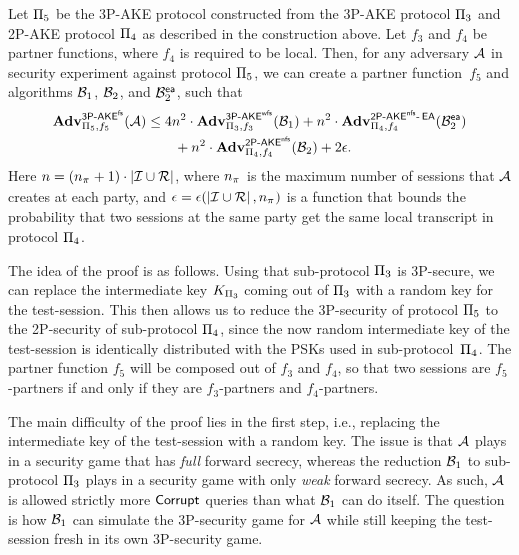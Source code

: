 \begin{theorem}\label{thm:protocol_5:3P-AKE}
Let $\protocol_5$ be the 3P-AKE protocol constructed from the 3P-AKE protocol $\protocol_3$ and 2P-AKE protocol $\protocol_4$ as described in the construction above.
Let $f_3$ and $f_4$ be partner functions,
where $f_4$ is required to be local.
Then,
for any adversary $\A$ in security experiment \akefstext against protocol $\protocol_5$,
we can create a partner function~$f_5$ and algorithms $\A[B]_1$, $\A[B]_2$, and $\A[B]_2^{\ea}$,
such that
\begin{equation}\label{eq:thm:P5:AKE}
	\begin{split}
	\adv_{\protocol_5,f_5}^{\operatorname{\mathsf{3P-\akefs}}} (\A) 
		&\leq 
		4n^2 \cdot \adv_{\protocol_3,f_3}^{\operatorname{\mathsf{3P-\akewfs}}}(\A[B]_1) 
		+ n^2 \cdot \adv_{{\protocol_4},{f_4}}^{\operatorname{\mathsf{2P-\akenfs-\EA}}}(\A[B]_2^{\ea}) \\ 
		&\qquad + n^2 \cdot \adv_{\protocol_4,f_4}^{\operatorname{\mathsf{2P-\akenfs}}}(\A[B]_2) + 2 \transcriptcollisionfunc. 
	\end{split}
\end{equation}
Here $n = (\numsessions+1) \cdot \left| \mathcal{I} \cup \mathcal{R} \right|$,
where $\numsessions$ is the maximum number of sessions that $\A$ creates at each party,
and $\transcriptcollisionfunc = \transcriptcollisionfunc(\left| \mathcal{I} \cup \mathcal{R} \right|, \numsessions)$ is a function that bounds the probability that two sessions at the same party get the same local transcript in protocol $\protocol_4$.
\end{theorem}
\normalsize


The idea of the proof  is as follows.
Using that sub-protocol $\protocol_3$ is 3P-\akewfstext secure,
we can replace the intermediate key $\KDkey$ coming out of $\protocol_3$ with a random key for the test-session.
This then allows us to reduce the 3P-\akefstext security of protocol $\protocol_5$ to the 2P-\akenfstext security of sub-protocol $\protocol_4$,
since the now random intermediate key of the test-session is identically distributed with the PSKs used in sub-protocol~$\protocol_4$. 
The partner function $f_5$ will be composed out of $f_3$ and $f_4$,
so that two sessions are $f_5$-partners if and only if they are $f_3$-partners and $f_4$-partners.

The main difficulty of the proof lies in the first step,
i.e., replacing the intermediate key of the test-session with a random key.
The issue is that $\A$ plays in a security game that has \emph{full} forward secrecy,
whereas the reduction $\A[B]_1$ to sub-protocol $\protocol_3$ plays in a security game with only \emph{weak} forward secrecy.
As such,
$\A$ is allowed strictly more $\Corrupt$ queries than what $\A[B]_1$ can do itself.
The question is how $\A[B]_1$ can simulate the 3P-\akefstext security game for $\A$
while still keeping the test-session fresh in its own 3P-\akewfstext security game. 

